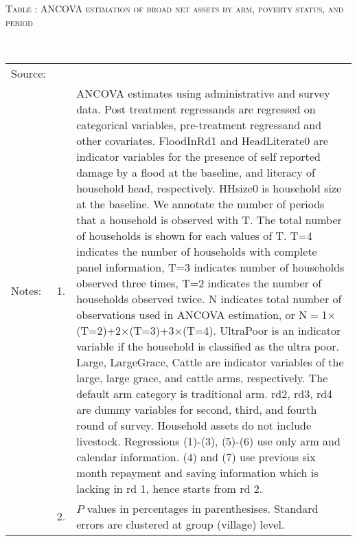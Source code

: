 \hspace{-1cm}\begin{minipage}[t]{14cm}
\hfil\textsc{\normalsize Table \thetable: ANCOVA estimation of broad net assets by arm, poverty status, and period\label{tab ANCOVA net assets timevarying poverty status}}\\
\setlength{\tabcolsep}{1pt}
\setlength{\baselineskip}{8pt}
\renewcommand{\arraystretch}{.55}
\hfil{}\\
\renewcommand{\arraystretch}{.8}
\setlength{\tabcolsep}{1pt}
\begin{tabular}{>{\hfill\scriptsize}p{1cm}<{}>{\hfill\scriptsize}p{.25cm}<{}>{\scriptsize}p{12cm}<{\hfill}}
Source:& \multicolumn{2}{l}{\scriptsize Estimated with GUK administrative and survey data.}\\
Notes: & 1. & ANCOVA estimates using administrative and survey data. Post treatment regressands are regressed on categorical variables, pre-treatment regressand and other covariates. \textsf{FloodInRd1} and \textsf{HeadLiterate0} are indicator variables for the presence of self reported damage by a flood at the baseline, and literacy of household head, respectively. \textsf{HHsize0} is household size at the baseline. We annotate the number of periods that a household is observed with \textsf{T}. The total number of households is shown for each values of \textsf{T}. \textsf{T=4} indicates the number of households with complete panel information, \textsf{T=3} indicates number of households observed three times, \textsf{T=2} indicates the number of households observed twice. \textsf{N} indicates total number of observations used in ANCOVA estimation, or \textsf{N$=$1$\times$(T=2)+2$\times$(T=3)+3$\times$(T=4)}.  \textsf{UltraPoor} is an indicator variable if the household is classified as the ultra poor. \textsf{Large}, \textsf{LargeGrace}, \textsf{Cattle} are indicator variables of the \textsf{large}, \textsf{large grace}, and \textsf{cattle} arms, respectively. The default arm category is \textsf{traditional} arm. \textsf{rd2, rd3, rd4} are dummy variables for second, third, and fourth round of survey. Household assets do not include livestock. Regressions (1)-(3), (5)-(6) use only arm and calendar information. (4) and (7) use previous six month repayment and saving information which is lacking in rd 1, hence starts from rd 2.\\
& 2. & $P$ values in percentages in parenthesises. Standard errors are clustered at group (village) level.
\end{tabular}
\end{minipage}

